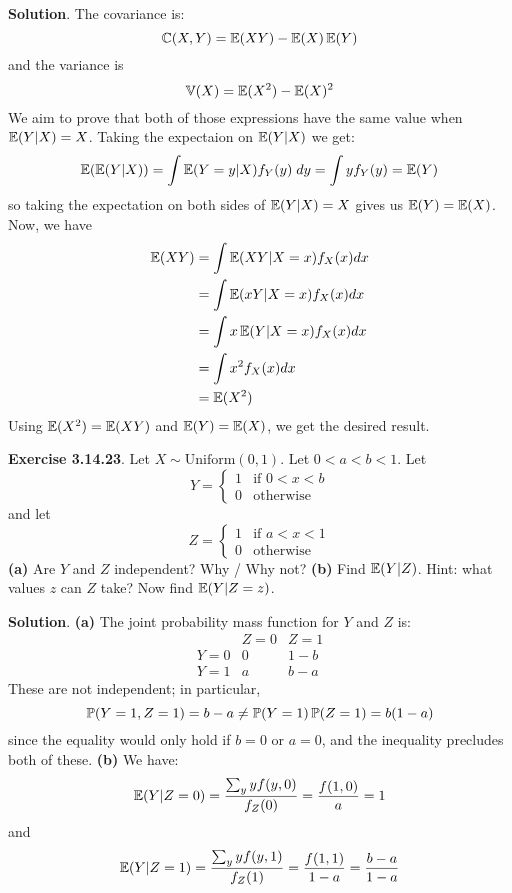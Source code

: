 \textbf{Solution}.
The covariance is:
\[
\operatorname{\mathbb{C}}(X, Y) = \operatorname{\mathbb{E}}(XY) - \operatorname{\mathbb{E}}(X) \operatorname{\mathbb{E}}(Y)
\]
and the variance is
\[
\operatorname{\mathbb{V}}(X) = \operatorname{\mathbb{E}}(X^{2}) - \operatorname{\mathbb{E}}(X)^{2}
\]
We aim to prove that both of those expressions have the same value when
\(\operatorname{\mathbb{E}}(Y | X) = X\).
Taking the expectaion on \(\operatorname{\mathbb{E}}(Y | X)\) we get:
\[
\operatorname{\mathbb{E}}(\operatorname{\mathbb{E}}(Y | X)) = \int \operatorname{\mathbb{E}}(Y = y | X) f_Y(y) \; dy = \int y f_Y(y) = \operatorname{\mathbb{E}}(Y)
\]
so taking the expectation on both sides of \(\operatorname{\mathbb{E}}(Y | X) = X\)
gives us \(\operatorname{\mathbb{E}}(Y) = \operatorname{\mathbb{E}}(X)\).
Now, we have
\begin{align*}
\operatorname{\mathbb{E}}(XY) &= \int \operatorname{\mathbb{E}}(XY | X = x) f_X(x) dx \\
&= \int \operatorname{\mathbb{E}}(xY | X = x) f_X(x) dx \\
&= \int x \operatorname{\mathbb{E}}(Y | X = x) f_X(x) dx \\
&= \int x^{2} f_X(x) dx \\
&= \operatorname{\mathbb{E}}(X^{2})
\end{align*}
Using \(\operatorname{\mathbb{E}}(X^{2}) = \operatorname{\mathbb{E}}(XY)\) and
\(\operatorname{\mathbb{E}}(Y) = \operatorname{\mathbb{E}}(X)\), we get the desired result.

\textbf{Exercise 3.14.23}. Let \(X \sim \text{Uniform}(0, 1)\). Let
\(0 < a < b < 1\). Let
\[
Y =
\begin{cases}
1 &\text{if } 0 < x < b
\\[
1ex]
0 &\text{otherwise}
\end{cases}
\]
and let
\[
Z =
\begin{cases}
1 &\text{if } a < x < 1 
\\[
1ex]
0 &\text{otherwise}
\end{cases}
\]
\textbf{(a)} Are \(Y\) and \(Z\) independent? Why / Why not?
\textbf{(b)} Find \(\operatorname{\mathbb{E}}(Y | Z)\). Hint: what values \(z\) can
\(Z\) take? Now find \(\operatorname{\mathbb{E}}(Y | Z = z)\).

\textbf{Solution}.
\textbf{(a)} The joint probability mass function for \(Y\) and \(Z\) is:
\[
\begin{array}{c|cc}
 & Z = 0 & Z = 1 \\
\hline
Y = 0 & 0 & 1 - b \\
Y = 1 & a & b - a
\end{array}
\]
These are not independent; in particular,
\[
\operatorname{\mathbb{P}}(Y = 1, Z = 1) = b - a \neq \operatorname{\mathbb{P}}(Y = 1) \operatorname{\mathbb{P}}(Z = 1) = b(1 - a)
\]
since the equality would only hold if \(b = 0\) or \(a = 0\), and the
inequality precludes both of these.
\textbf{(b)} We have:
\[
\operatorname{\mathbb{E}}(Y | Z = 0) = \frac{\sum_y y f(y, 0)}{f_Z(0)} = \frac{f(1, 0)}{a} = 1
\]
and
\[
\operatorname{\mathbb{E}}(Y | Z = 1) = \frac{\sum_y y f(y, 1)}{f_Z(1)} = \frac{f(1, 1)}{1 - a} = \frac{b - a}{1 - a}
\]
